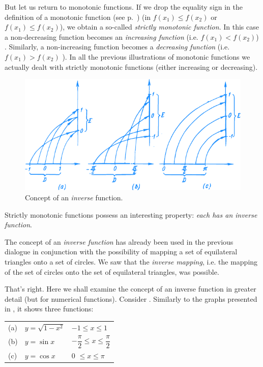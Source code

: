 {But let us return to monotonic functions. If we drop the equality sign in the definition of a monotonic function (see p.~\pageref{monotonic-def}) (in $f (x_{1}) \leqslant f (x_{2})$ or $f (x_{1}) \leqslant f (x_{2})$), we obtain a so-called \emph{strictly monotonic function}. In this case a non-decreasing function becomes an \emph{increasing function} (i.e. $f (x_{1}) < f (x_{2})$) . Similarly, a non-increasing function becomes a \emph{decreasing function} (i.e. $f (x_{1}) > f (x_{2})$ ). In all the previous illustrations of monotonic functions we actually dealt with strictly monotonic functions (either increasing or decreasing).
\begin{figure}[!h]
\centering
\includegraphics[width=\textwidth]{figures/fig-18.pdf}
\caption{ Concept of an \emph{inverse} function.}
\label{fig-18}
\end{figure}
Strictly monotonic functions possess an interesting property: \emph{each has an inverse function}.

\rdr The concept of an \emph{inverse function} has already been used in the previous dialogue in conjunction with the possibility of mapping a set of equilateral triangles onto a set of circles. We saw that the \emph{inverse mapping}, i.e. the mapping of the set of circles onto the set of equilateral triangles, was possible.

\athr That's right. Here we shall examine the concept of an inverse function in greater detail (but for numerical functions). Consider . Similarly to the graphs presented in , it shows three functions:

\begin{tabular}{lll}
(a) & $y= \sqrt{1-x^{2}}$ & $-1 \leqslant x \leqslant 1$ \\
(b) & $y= \sin x$ &   $- \dfrac{\pi}{2} \leqslant x \leqslant \dfrac{\pi}{2}$\\
(c) & $y= \cos x$ &  0 $\leqslant x  \leqslant  \pi$
\end{tabular}

}
